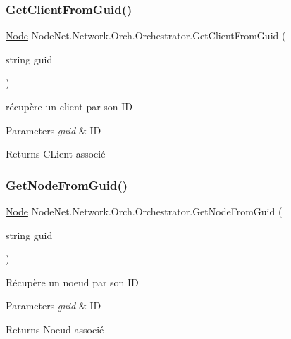 \subsubsection{\texorpdfstring{Get\+Client\+From\+Guid()}{GetClientFromGuid()}}
{\footnotesize\ttfamily \hyperlink{class_node_net_1_1_network_1_1_nodes_1_1_node}{Node} Node\+Net.\+Network.\+Orch.\+Orchestrator.\+Get\+Client\+From\+Guid (\begin{DoxyParamCaption}\item[{string}]{guid }\end{DoxyParamCaption})\hspace{0.3cm}{\ttfamily [protected]}}



récupère un client par son ID 


\begin{DoxyParams}{Parameters}
{\em guid} & ID\\
\hline
\end{DoxyParams}
\begin{DoxyReturn}{Returns}
C\+Lient associé
\end{DoxyReturn}
\mbox{\label{class_node_net_1_1_network_1_1_orch_1_1_orchestrator_a890e7f185cf857d9baa9a99fe1430906}} 
\subsubsection{\texorpdfstring{Get\+Node\+From\+Guid()}{GetNodeFromGuid()}}
{\footnotesize\ttfamily \hyperlink{class_node_net_1_1_network_1_1_nodes_1_1_node}{Node} Node\+Net.\+Network.\+Orch.\+Orchestrator.\+Get\+Node\+From\+Guid (\begin{DoxyParamCaption}\item[{string}]{guid }\end{DoxyParamCaption})\hspace{0.3cm}{\ttfamily [protected]}}



Récupère un noeud par son ID 


\begin{DoxyParams}{Parameters}
{\em guid} & ID\\
\hline
\end{DoxyParams}
\begin{DoxyReturn}{Returns}
Noeud associé
\end{DoxyReturn}
\mbox{\label{class_node_net_1_1_network_1_1_orch_1_1_orchestrator_a2cfb309a5a30e4bb85709b999c7d80ec}} 
